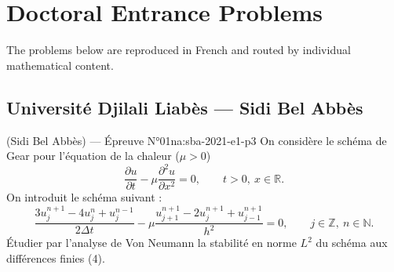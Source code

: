 \chapter{Doctoral Entrance Problems}
\label{ch:problems}

The problems below are reproduced in French and routed by individual mathematical content.
\newpage

\section{Université Djilali Liabès --- Sidi Bel Abbès}
\begin{problem}{(Sidi Bel Abbès) — Épreuve N°01}{na:sba-2021-e1-p3}
On considère le schéma de Gear pour l'équation de la chaleur ($\mu > 0$)
$$
\frac{\partial u}{\partial t} - \mu \frac{\partial^2 u}{\partial x^2} = 0, \qquad t > 0,\ x \in \mathbb{R}.
$$
On introduit le schéma suivant :
$$
\frac{3 u_j^{n+1} - 4 u_j^n + u_j^{n-1}}{2 \Delta t} - \mu \frac{u_{j+1}^{n+1} - 2 u_j^{n+1} + u_{j-1}^{n+1}}{h^2} = 0, \qquad j \in \mathbb{Z},\ n \in \mathbb{N}. \tag{4}
$$
Étudier par l'analyse de Von Neumann la stabilité en norme $L^2$ du schéma aux différences finies (4).
\end{problem}
